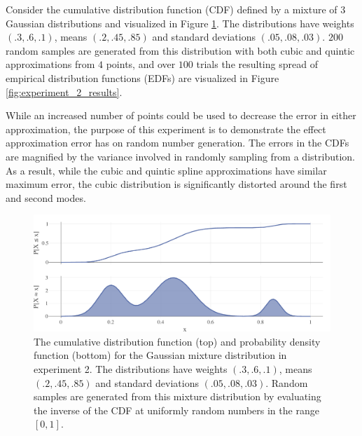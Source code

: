 \documentclass{scspaperproc}
\theoremstyle{scsthe}
\begin{document}
Consider the cumulative distribution function (CDF) defined by a mixture of $3$ Gaussian distributions and visualized in Figure \ref{fig:experiment_2_distribution}. The distributions have weights $(.3, .6, .1)$, means $(.2, .45, .85)$ and standard deviations $(.05, .08, .03)$. $200$ random samples are generated from this distribution with both cubic and quintic approximations from $4$ points, and over $100$ trials the resulting spread of empirical distribution functions (EDFs) are visualized in Figure \ref{fig:experiment_2_results}.

While an increased number of points could be used to decrease the error in either approximation, the purpose of this experiment is to demonstrate the effect approximation error has on random number generation. The errors in the CDFs are magnified by the variance involved in randomly sampling from a distribution. As a result, while the cubic and quintic spline approximations have similar maximum error, the cubic distribution is significantly distorted around the first and second modes.

\begin{figure}
  \centering
  \includegraphics[width=.8\textwidth]{experiment_2_distribution}
  \caption{The cumulative distribution function (top) and probability density function (bottom) for the Gaussian mixture distribution in experiment 2. The distributions have weights $(.3, .6, .1)$, means $(.2, .45, .85)$ and standard deviations $(.05, .08, .03)$. Random samples are generated from this mixture distribution by evaluating the inverse of the CDF at uniformly random numbers in the range $[0,1]$.}
  \label{fig:experiment_2_distribution}
\end{figure}
\end{document}
